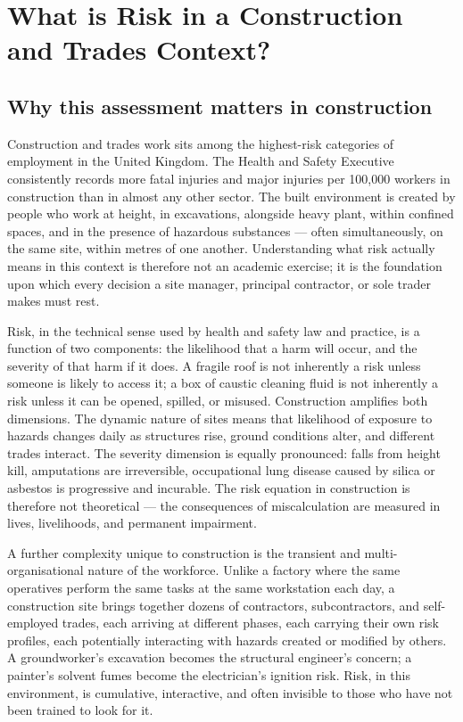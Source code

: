 \chapter{What is Risk in a Construction and Trades Context?}
\label{chap:What is Risk in a Construction and Trades Context?}

\section{Why this assessment matters in construction}

Construction and trades work sits among the highest-risk categories of employment in the United Kingdom. The Health and Safety Executive consistently records more fatal injuries and major injuries per 100,000 workers in construction than in almost any other sector. The built environment is created by people who work at height, in excavations, alongside heavy plant, within confined spaces, and in the presence of hazardous substances --- often simultaneously, on the same site, within metres of one another. Understanding what risk actually means in this context is therefore not an academic exercise; it is the foundation upon which every decision a site manager, principal contractor, or sole trader makes must rest.

Risk, in the technical sense used by health and safety law and practice, is a function of two components: the likelihood that a harm will occur, and the severity of that harm if it does. A fragile roof is not inherently a risk unless someone is likely to access it; a box of caustic cleaning fluid is not inherently a risk unless it can be opened, spilled, or misused. Construction amplifies both dimensions. The dynamic nature of sites means that likelihood of exposure to hazards changes daily as structures rise, ground conditions alter, and different trades interact. The severity dimension is equally pronounced: falls from height kill, amputations are irreversible, occupational lung disease caused by silica or asbestos is progressive and incurable. The risk equation in construction is therefore not theoretical --- the consequences of miscalculation are measured in lives, livelihoods, and permanent impairment.

A further complexity unique to construction is the transient and multi-organisational nature of the workforce. Unlike a factory where the same operatives perform the same tasks at the same workstation each day, a construction site brings together dozens of contractors, subcontractors, and self-employed trades, each arriving at different phases, each carrying their own risk profiles, each potentially interacting with hazards created or modified by others. A groundworker's excavation becomes the structural engineer's concern; a painter's solvent fumes become the electrician's ignition risk. Risk, in this environment, is cumulative, interactive, and often invisible to those who have not been trained to look for it.

